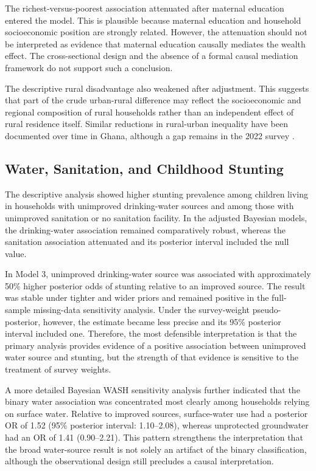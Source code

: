 The richest-versus-poorest association attenuated after maternal education entered the model. This is plausible because maternal education and household socioeconomic position are strongly related. However, the attenuation should not be interpreted as evidence that maternal education causally mediates the wealth effect. The cross-sectional design and the absence of a formal causal mediation framework do not support such a conclusion.

The descriptive rural disadvantage also weakened after adjustment. This suggests that part of the crude urban-rural difference may reflect the socioeconomic and regional composition of rural households rather than an independent effect of rural residence itself. Similar reductions in rural-urban inequality have been documented over time in Ghana, although a gap remains in the 2022 survey \citep{OsborneEtAl2025}.

\subsection{Water, Sanitation, and Childhood Stunting}

The descriptive analysis showed higher stunting prevalence among children living in households with unimproved drinking-water sources and among those with unimproved sanitation or no sanitation facility. In the adjusted Bayesian models, the drinking-water association remained comparatively robust, whereas the sanitation association attenuated and its posterior interval included the null value.

In Model 3, unimproved drinking-water source was associated with approximately 50\% higher posterior odds of stunting relative to an improved source. The result was stable under tighter and wider priors and remained positive in the full-sample missing-data sensitivity analysis. Under the survey-weight pseudo-posterior, however, the estimate became less precise and its 95\% posterior interval included one. Therefore, the most defensible interpretation is that the primary analysis provides evidence of a positive association between unimproved water source and stunting, but the strength of that evidence is sensitive to the treatment of survey weights.

A more detailed Bayesian WASH sensitivity analysis further indicated that the binary water association was concentrated most clearly among households relying on surface water. Relative to improved sources, surface-water use had a posterior OR of 1.52 (95\% posterior interval: 1.10--2.08), whereas unprotected groundwater had an OR of 1.41 (0.90--2.21). This pattern strengthens the interpretation that the broad water-source result is not solely an artifact of the binary classification, although the observational design still precludes a causal interpretation.

